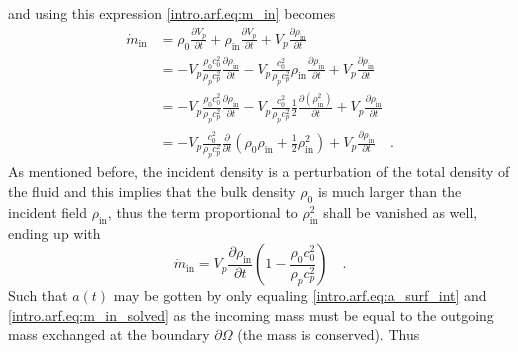 and using this expression \eqref{intro.arf.eq:m_in} becomes
\begin{align}
    \dot{m}_{\text{in}} &= \rho_0\frac{\partial V_p}{\partial t} + \rho_{\text{in}}\frac{\partial V_p}{\partial t} + V_p\frac{\partial\rho_{\text{in}}}{\partial t} \nonumber\\
    &= -V_p\frac{\rho_0c_0^2}{\rho_pc_p^2}\frac{\partial\rho_{\text{in}}}{\partial t} -V_p\frac{c_0^2}{\rho_pc_p^2}\rho_{\text{in}}\frac{\partial\rho_{\text{in}}}{\partial t} + V_p\frac{\partial\rho_{\text{in}}}{\partial t} \nonumber\\
    &= -V_p\frac{\rho_0c_0^2}{\rho_pc_p^2}\frac{\partial\rho_{\text{in}}}{\partial t} -V_p\frac{c_0^2}{\rho_pc_p^2}\frac{1}{2}\frac{\partial(\rho_{\text{in}}^2)}{\partial t} + V_p\frac{\partial\rho_{\text{in}}}{\partial t} \nonumber\\
    &= -V_p\frac{c_0^2}{\rho_pc_p^2}\frac{\partial}{\partial t}\left(\rho_0\rho_{\text{in}} + \frac{1}{2}\rho_{\text{in}}^2\right) + V_p\frac{\partial\rho_{\text{in}}}{\partial t}\quad.
\end{align}
As mentioned before, the incident density is a perturbation of the total density of the fluid and this implies that the bulk density $\rho_0$ is much larger than the incident field $\rho_{\text{in}}$, thus the term proportional to $\rho_{\text{in}}^2$ shall be vanished as well, ending up with
\begin{equation}\label{intro.arf.eq:m_in_solved}
    \dot{m}_{\text{in}} = V_p\frac{\partial\rho_{\text{in}}}{\partial t}\left(1-\frac{\rho_0c_0^2}{\rho_pc_p^2}\right)\quad.
\end{equation}
Such that $a(t)$ may be gotten by only equaling \eqref{intro.arf.eq:a_surf_int} and \eqref{intro.arf.eq:m_in_solved} as the incoming mass must be equal to the outgoing mass exchanged at the boundary $\partial\Omega$ (the mass is conserved). Thus

